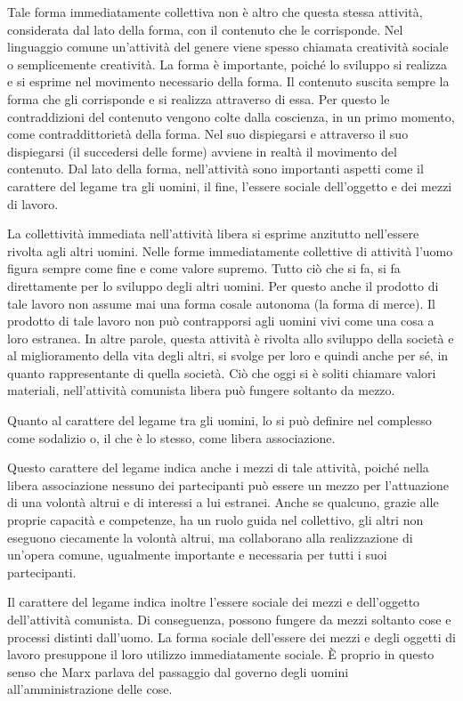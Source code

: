 \documentclass[12pt,a4paper,openany]{book}
\begin{document}
Tale forma immediatamente collettiva non è altro che questa stessa attività, considerata dal lato della forma, con il contenuto che le corrisponde. Nel linguaggio comune un'attività del genere viene spesso chiamata creatività sociale o semplicemente creatività. La forma è importante, poiché lo sviluppo si realizza e si esprime nel movimento necessario della forma. Il contenuto suscita sempre la forma che gli corrisponde e si realizza attraverso di essa. Per questo le contraddizioni del contenuto vengono colte dalla coscienza, in un primo momento, come contraddittorietà della forma. Nel suo dispiegarsi e attraverso il suo dispiegarsi (il succedersi delle forme) avviene in realtà il movimento del contenuto. Dal lato della forma, nell'attività sono importanti aspetti come il carattere del legame tra gli uomini, il fine, l'essere sociale dell'oggetto e dei mezzi di lavoro.

La collettività immediata nell'attività libera si esprime anzitutto nell'essere rivolta agli altri uomini. Nelle forme immediatamente collettive di attività l'uomo figura sempre come fine e come valore supremo. Tutto ciò che si fa, si fa direttamente per lo sviluppo degli altri uomini. Per questo anche il prodotto di tale lavoro non assume mai una forma cosale autonoma (la forma di merce). Il prodotto di tale lavoro non può contrapporsi agli uomini vivi come una cosa a loro estranea. In altre parole, questa attività è rivolta allo sviluppo della società e al miglioramento della vita degli altri, si svolge per loro e quindi anche per sé, in quanto rappresentante di quella società. Ciò che oggi si è soliti chiamare valori materiali, nell'attività comunista libera può fungere soltanto da mezzo.

Quanto al carattere del legame tra gli uomini, lo si può definire nel complesso come sodalizio o, il che è lo stesso, come libera associazione.

Questo carattere del legame indica anche i mezzi di tale attività, poiché nella libera associazione nessuno dei partecipanti può essere un mezzo per l'attuazione di una volontà altrui e di interessi a lui estranei. Anche se qualcuno, grazie alle proprie capacità e competenze, ha un ruolo guida nel collettivo, gli altri non eseguono ciecamente la volontà altrui, ma collaborano alla realizzazione di un'opera comune, ugualmente importante e necessaria per tutti i suoi partecipanti.

Il carattere del legame indica inoltre l'essere sociale dei mezzi e dell'oggetto dell'attività comunista. Di conseguenza, possono fungere da mezzi soltanto cose e processi distinti dall'uomo. La forma sociale dell'essere dei mezzi e degli oggetti di lavoro presuppone il loro utilizzo immediatamente sociale. È proprio in questo senso che Marx parlava del passaggio dal governo degli uomini all'amministrazione delle cose.
\end{document}

